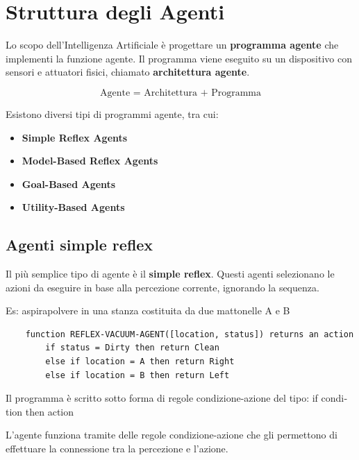 \section{Struttura degli Agenti}

Lo scopo dell'Intelligenza Artificiale è progettare un
\textbf{programma agente} che implementi la funzione agente. Il programma viene eseguito su un dispositivo con sensori e attuatori fisici, chiamato \textbf{architettura agente}.

\begin{equation}
	\text{Agente = Architettura + Programma}
\end{equation}

Esistono diversi tipi di programmi agente, tra cui:

\begin{itemize}
	\item \textbf{Simple Reflex Agents}
	\item \textbf{Model-Based Reflex Agents}
	\item \textbf{Goal-Based Agents}
	\item \textbf{Utility-Based Agents}
\end{itemize}


\subsection{Agenti \foreignlanguage{english}{simple reflex}}

Il più semplice tipo di agente è il \foreignlanguage{english}{\textbf{simple reflex}}. Questi agenti 
selezionano le azioni da eseguire in base alla percezione corrente, ignorando
 la sequenza.

Es: aspirapolvere in una stanza costituita da due mattonelle A e B

\begin{lstlisting}
	function REFLEX-VACUUM-AGENT([location, status]) returns an action
		if status = Dirty then return Clean
		else if location = A then return Right
		else if location = B then return Left
\end{lstlisting}

Il programma è scritto sotto forma di regole condizione-azione del tipo: \foreignlanguage{english}{if condition then action}

L'agente funziona tramite delle regole condizione-azione che gli permettono di effettuare la connessione tra la 
percezione e l'azione.

